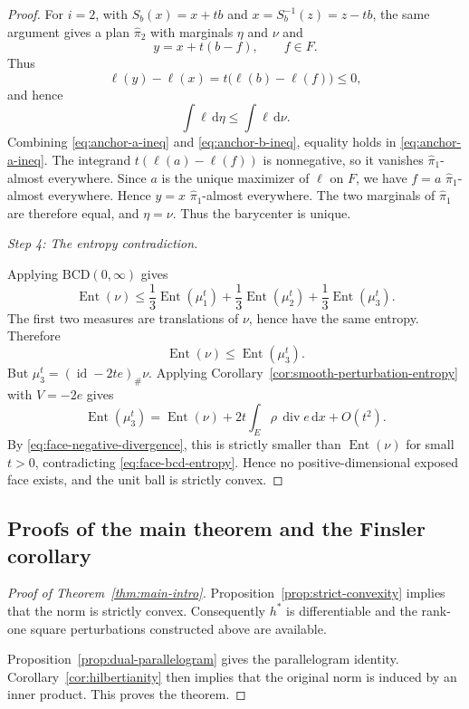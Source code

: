 \documentclass[a4paper,11pt]{article}
\numberwithin{equation}{section}
\newcommand{\Ent}{\operatorname{Ent}}
\newcommand{\id}{\operatorname{id}}
\newcommand{\diver}{\operatorname{div}}
\newcommand{\dd}{\mathrm d}
\begin{document}
\begin{proof}
		For $i=2$, with $S_b(x)=x+tb$ and $x=S_b^{-1}(z)=z-tb$, the same argument gives a plan $\widehat\pi_2$ with marginals $\eta$ and $\nu$ and
		\[
		y=x+t(b-f),
		\qquad f\in F.
		\]
		Thus
		\[
		\ell(y)-\ell(x)=t\bigl(\ell(b)-\ell(f)\bigr)\le0,
		\]
		and hence
		\begin{equation}\label{eq:anchor-b-ineq}
			\int \ell\,\dd\eta\le\int \ell\,\dd\nu.
		\end{equation}
		Combining \eqref{eq:anchor-a-ineq} and \eqref{eq:anchor-b-ineq}, equality holds in \eqref{eq:anchor-a-ineq}. The integrand $t(\ell(a)-\ell(f))$ is nonnegative, so it vanishes \(\widehat\pi_1\)-almost everywhere. Since $a$ is the unique maximizer of $\ell$ on $F$, we have $f=a$ \(\widehat\pi_1\)-almost everywhere. Hence $y=x$ \(\widehat\pi_1\)-almost everywhere. The two marginals of $\widehat\pi_1$ are therefore equal, and $\eta=\nu$.
		Thus the barycenter is unique.
		
		
		\medskip
		\noindent\emph{Step 4: The entropy contradiction.}
		
		 Applying $\mathrm{BCD}(0,\infty)$ gives
		\[
		\Ent(\nu)
		\le\frac13\Ent(\mu_1^t)+\frac13\Ent(\mu_2^t)+\frac13\Ent(\mu_3^t).
		\]
		The first two measures are translations of $\nu$, hence have the same entropy. Therefore
		\begin{equation}\label{eq:face-bcd-entropy}
			\Ent(\nu)\le \Ent(\mu_3^t).
		\end{equation}
		But $\mu_3^t=(\id-2t e)_\#\nu$. Applying Corollary~\ref{cor:smooth-perturbation-entropy} with $V=-2e$ gives
		\[
		\Ent(\mu_3^t)
		=\Ent(\nu)+2t\int_E\rho\,\diver e\,\dd x+O(t^2).
		\]
		By \eqref{eq:face-negative-divergence}, this is strictly smaller than $\Ent(\nu)$ for small $t>0$, contradicting \eqref{eq:face-bcd-entropy}. Hence no positive-dimensional exposed face exists, and the unit ball is strictly convex.
	\end{proof}
	
	\subsection*{Proofs of the main theorem and the Finsler corollary}\label{sec:main-corollary-proofs}
	
	\begin{proof}[Proof of Theorem~\ref{thm:main-intro}]
		Proposition~\ref{prop:strict-convexity} implies that the norm is strictly convex. Consequently \(h^*\) is differentiable and the rank-one
		square perturbations constructed above are available.
		
		Proposition~\ref{prop:dual-parallelogram} gives the
		parallelogram identity. Corollary~\ref{cor:hilbertianity} then implies that the original
		norm is induced by an inner product. This proves the theorem.
	\end{proof}
	
\end{document}
